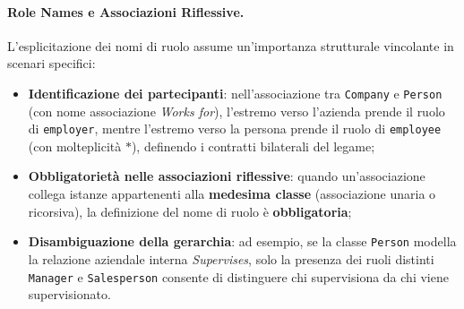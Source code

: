 \documentclass[12pt]{extarticle}
\begin{document}
\paragraph{Role Names e Associazioni Riflessive.}
L'esplicitazione dei nomi di ruolo assume un'importanza strutturale vincolante in scenari specifici:
\begin{itemize}
    \item \textbf{Identificazione dei partecipanti}: nell'associazione tra \texttt{Company} e \texttt{Person} (con nome associazione \textit{Works for}), l'estremo verso l'azienda prende il ruolo di \texttt{employer}, mentre l'estremo verso la persona prende il ruolo di \texttt{employee} (con molteplicità $*$), definendo i contratti bilaterali del legame;
    \item \textbf{Obbligatorietà nelle associazioni riflessive}: quando un'associazione collega istanze appartenenti alla \textbf{medesima classe} (associazione unaria o ricorsiva), la definizione del nome di ruolo è \textbf{obbligatoria};
    \item \textbf{Disambiguazione della gerarchia}: ad esempio, se la classe \texttt{Person} modella la relazione aziendale interna \textit{Supervises}, solo la presenza dei ruoli distinti \texttt{Manager} e \texttt{Salesperson} consente di distinguere chi supervisiona da chi viene supervisionato.
\end{itemize}
\end{document}
